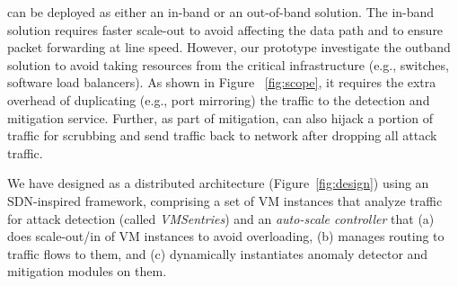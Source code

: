 \nimbus can be deployed as either an in-band or an out-of-band
solution. The in-band solution requires faster scale-out to avoid affecting the data path and to ensure packet forwarding at line speed.
However, our prototype investigate the outband solution to avoid taking resources from the critical infrastructure (e.g., switches, software load balancers). 
As shown in Figure ~\ref{fig:scope}, it requires the extra overhead of duplicating (e.g., port mirroring) the traffic to the detection and mitigation service. Further, as part of mitigation, \nimbus can also hijack a portion of traffic for scrubbing and send traffic back to network after dropping all attack traffic.



We have designed \nimbus as a distributed architecture
(Figure~\ref{fig:design}) 
using an SDN-inspired framework, 
comprising a set of VM instances that analyze traffic for attack detection  
(called \emph{VMSentries}) and an \emph{auto-scale controller}
that (a) does scale-out/in of VM instances to avoid overloading,
(b) manages routing to traffic flows to them, and 
(c) dynamically instantiates anomaly detector and mitigation modules on them.

